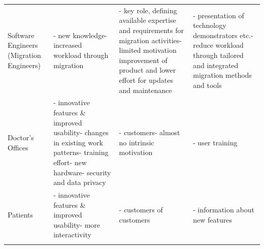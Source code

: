 \begin{longtable}[]{@{}llll@{}}
\begin{minipage}[t]{0.16\columnwidth}
Software Engineers (Migration Engineers)\strut
\end{minipage} & \begin{minipage}[t]{0.24\columnwidth}\raggedright
- new knowledge- increased workload through migration\strut
\end{minipage} & \begin{minipage}[t]{0.24\columnwidth}\raggedright
- key role, defining available expertise and requirements for migration activities- limited motivation improvement of product and lower effort for updates and maintenance\strut
\end{minipage} & \begin{minipage}[t]{0.24\columnwidth}\raggedright
- presentation of technology demonstrators etc.- reduce workload through tailored and integrated migration methods and tools\strut
\end{minipage}\tabularnewline
\begin{minipage}[t]{0.16\columnwidth}\raggedright
Doctor's Offices\strut
\end{minipage} & \begin{minipage}[t]{0.24\columnwidth}\raggedright
- innovative features \& improved usability- changes in existing work patterns- training effort- new hardware- security and data privacy\strut
\end{minipage} & \begin{minipage}[t]{0.24\columnwidth}\raggedright
- customers- almost no intrinsic motivation\strut
\end{minipage} & \begin{minipage}[t]{0.24\columnwidth}\raggedright
- user training\strut
\end{minipage}\tabularnewline
\begin{minipage}[t]{0.16\columnwidth}\raggedright
Patients\strut
\end{minipage} & \begin{minipage}[t]{0.24\columnwidth}\raggedright
- innovative features \& improved usability- more interactivity\strut
\end{minipage} & \begin{minipage}[t]{0.24\columnwidth}\raggedright
- customers of customers\strut
\end{minipage} & \begin{minipage}[t]{0.24\columnwidth}\raggedright
- information about new features\strut
\end{minipage}\tabularnewline
\begin{minipage}[t]{0.16\columnwidth}\raggedright

\end{minipage}
\end{longtable}
